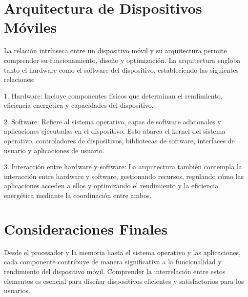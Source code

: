 \documentclass{article}
\begin{document}
	\section{Arquitectura de Dispositivos Móviles}
	La relación intrínseca entre un dispositivo móvil y su arquitectura permite comprender su funcionamiento, diseño y optimización. La arquitectura engloba tanto el hardware como el software del dispositivo, estableciendo las siguientes relaciones:
	
	1. Hardware: Incluye componentes físicos que determinan el rendimiento, eficiencia energética y capacidades del dispositivo.
	
	2. Software: Refiere al sistema operativo, capas de software adicionales y aplicaciones ejecutadas en el dispositivo. Esto abarca el kernel del sistema operativo, controladores de dispositivos, bibliotecas de software, interfaces de usuario y aplicaciones de usuario.
	
	3. Interacción entre hardware y software: La arquitectura también contempla la interacción entre hardware y software, gestionando recursos, regulando cómo las aplicaciones acceden a ellos y optimizando el rendimiento y la eficiencia energética mediante la coordinación entre ambos.
	
	\section{Consideraciones Finales}
	Desde el procesador y la memoria hasta el sistema operativo y las aplicaciones, cada componente contribuye de manera significativa a la funcionalidad y rendimiento del dispositivo móvil. Comprender la interrelación entre estos elementos es esencial para diseñar dispositivos eficientes y satisfactorios para los usuarios.
	
\end{document}
